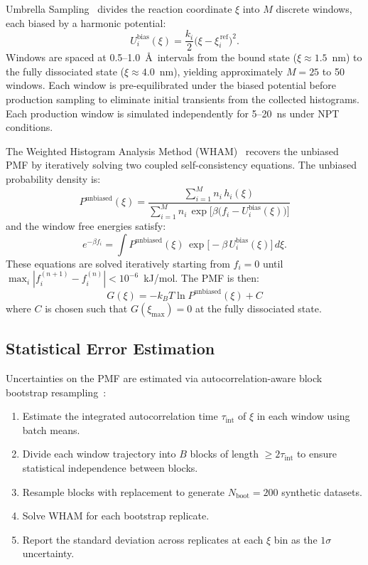 \documentclass[conference]{IEEEtran}
\begin{document}
Umbrella Sampling~\cite{kumar1992} divides the reaction coordinate $\xi$
into $M$ discrete windows, each biased by a harmonic potential:
\begin{equation}\label{eq:umbrella_bias}
  U_i^{\mathrm{bias}}(\xi) = \frac{k_i}{2}
    \bigl(\xi - \xi_i^{\,\mathrm{ref}}\bigr)^2.
\end{equation}
Windows are spaced at 0.5--1.0~\AA\ intervals from the bound state
($\xi \approx 1.5$~nm) to the fully dissociated state
($\xi \approx 4.0$~nm), yielding approximately $M = 25$ to 50 windows.
Each window is pre-equilibrated under the biased potential before
production sampling to eliminate initial transients from the collected
histograms.  Each production window is simulated independently for
5--20~ns under NPT conditions.

The Weighted Histogram Analysis Method (WHAM)~\cite{kumar1992} recovers the
unbiased PMF by iteratively solving two coupled self-consistency equations.
The unbiased probability density is:
\begin{equation}\label{eq:wham_prob}
  P^{\mathrm{unbiased}}(\xi) = \frac{
    \sum_{i=1}^{M} n_i\,h_i(\xi)
  }{
    \sum_{i=1}^{M} n_i\,\exp\!\bigl[
      \beta\bigl(f_i - U_i^{\mathrm{bias}}(\xi)\bigr)
    \bigr]
  }
\end{equation}
and the window free energies satisfy:
\begin{equation}\label{eq:wham_free}
  e^{-\beta f_i} = \int P^{\mathrm{unbiased}}(\xi)\,
    \exp\!\bigl[-\beta\,U_i^{\mathrm{bias}}(\xi)\bigr]\,d\xi.
\end{equation}
These equations are solved iteratively starting from $f_i = 0$ until
$\max_i |f_i^{(n+1)} - f_i^{(n)}| < 10^{-6}$~kJ/mol.  The PMF is then:
\begin{equation}\label{eq:pmf}
  G(\xi) = -k_B T \ln P^{\mathrm{unbiased}}(\xi) + C
\end{equation}
where $C$ is chosen such that $G(\xi_{\max}) = 0$ at the fully dissociated
state.

\subsection{Statistical Error Estimation}\label{sec:errors}

Uncertainties on the PMF are estimated via autocorrelation-aware block
bootstrap resampling~\cite{hub2010,kuensch1989}:
\begin{enumerate}
  \item Estimate the integrated autocorrelation time $\tau_{\mathrm{int}}$
    of $\xi$ in each window using batch means.
  \item Divide each window trajectory into $B$ blocks of length
    $\geq 2\tau_{\mathrm{int}}$ to ensure statistical independence
    between blocks.
  \item Resample blocks with replacement to generate
    $N_{\mathrm{boot}} = 200$ synthetic datasets.
  \item Solve WHAM for each bootstrap replicate.
  \item Report the standard deviation across replicates at each $\xi$ bin
    as the $1\sigma$ uncertainty.
\end{enumerate}
\end{document}
